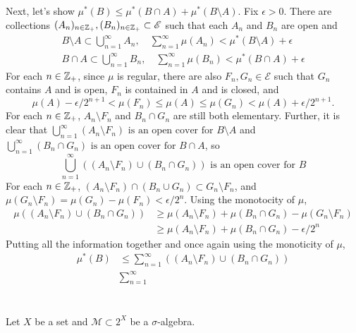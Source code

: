 \documentclass[12pt]{article}
\begin{document}
Next, let's show $\mu^{*}(B) \leq \mu^{*} (B \cap A) + \mu^{*} (B \setminus A)$. 
Fix $\epsilon > 0$. 
There are collections $(A_n)_{n \in \mathbb{Z}_{+}}, (B_n)_{n \in \mathbb{Z}_{+}} \subset \mathscr{E}$ such that each $A_n$ and $B_n$ are open and 
\begin{gather*}
  B \setminus A \subset \bigcup_{n = 1}^{\infty} A_n, \quad \sum_{n = 1}^{\infty} \mu(A_n) < \mu^{*} (B \setminus A) + \epsilon \\ 
  B \cap A \subset \bigcup_{n = 1}^{\infty} B_n, \quad \sum_{n = 1}^{\infty} \mu(B_n) < \mu^{*} (B \cap A) + \epsilon
\end{gather*}
For each $n \in \mathbb{Z}_{+}$, since $\mu$ is regular, there are also $F_n, G_n \in \mathscr{E}$ such that $G_n$ contains $A$ and is open, $F_n$ is contained in $A$ and is closed, and 
$$\mu(A) - \epsilon / 2^{n + 1} < \mu(F_n) \leq \mu(A) \leq \mu(G_n) < \mu(A) + \epsilon / 2^{n + 1}.$$
For each $n \in \mathbb{Z}_{+}$, $A_n \setminus F_n$ and $B_n \cap G_n$ are still both elementary. 
Further, it is clear that $\bigcup_{n = 1}^{\infty} (A_n \setminus F_n) \text{ is an open cover for } B \setminus A$ and $\bigcup_{n = 1}^{\infty} (B_n \cap G_n) \text{ is an open cover for } B \cap A$, so  %
$$\bigcup_{n = 1}^{\infty} ((A_n \setminus F_n) \cup (B_n \cap G_n)) \text{ is an open cover for } B$$
For each $n \in \mathbb{Z}_{+}$, $(A_n \setminus F_n) \cap (B_n \cup G_n) \subset G_n \setminus F_n$, and $\mu(G_n \setminus F_n) = \mu(G_n) - \mu(F_n) < \epsilon / 2^n$. 
Using the monotocity of $\mu$, 
\begin{align*} 
  \mu((A_n \setminus F_n) \cup (B_n \cap G_n)) & \geq \mu(A_n \setminus F_n) + \mu(B_n \cap G_n) - \mu(G_n \setminus F_n) \\ 
											   & \geq \mu(A_n \setminus F_n) + \mu(B_n \cap G_n) - \epsilon / 2^{n} 
\end{align*} 
Putting all the information together and once again using the monoticity of $\mu$, 
\begin{align*}
  \mu^{*} (B) & \leq \sum_{n = 1}^{\infty} ((A_n \setminus F_n) \cup (B_n \cap G_n)) \\ 
			  & \sum_{n = 1}^{\infty} 
\end{align*} %

\subsection{} 

\section{} 
Let $X$ be a set and $\mathscr{M} \subset 2^{X}$ be a $\sigma$-algebra. 
\end{document}
